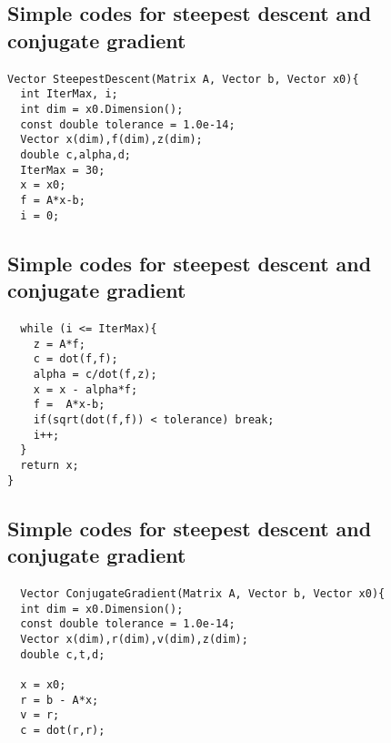 \documentclass[%
twoside,                 %
final,                   %
10pt]{article}
\begin{document}
\subsection*{Simple codes for  steepest descent and conjugate gradient}

\paragraph{}
\begin{verbatim}
Vector SteepestDescent(Matrix A, Vector b, Vector x0){
  int IterMax, i;
  int dim = x0.Dimension();
  const double tolerance = 1.0e-14;
  Vector x(dim),f(dim),z(dim);
  double c,alpha,d;
  IterMax = 30;
  x = x0;
  f = A*x-b;
  i = 0;
\end{verbatim}




\subsection*{Simple codes for  steepest descent and conjugate gradient}

\paragraph{}
\begin{verbatim}
  while (i <= IterMax){
    z = A*f;
    c = dot(f,f);
    alpha = c/dot(f,z);
    x = x - alpha*f;
    f =  A*x-b;
    if(sqrt(dot(f,f)) < tolerance) break;
    i++;
  }
  return x;
} 
\end{verbatim}




\subsection*{Simple codes for  steepest descent and conjugate gradient}

\paragraph{}
\begin{verbatim}
  Vector ConjugateGradient(Matrix A, Vector b, Vector x0){
  int dim = x0.Dimension();
  const double tolerance = 1.0e-14;
  Vector x(dim),r(dim),v(dim),z(dim);
  double c,t,d;

  x = x0;
  r = b - A*x;
  v = r;
  c = dot(r,r);
\end{verbatim}
\end{document}
